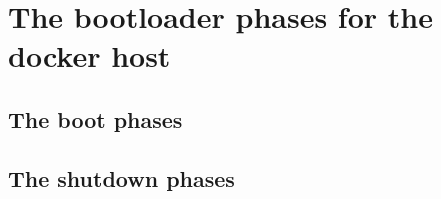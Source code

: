 \chapter{The bootloader phases for the docker host}\label{p01:ch08}
	\section{The boot phases}
	\section{The shutdown phases}